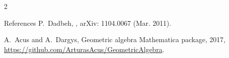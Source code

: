 \documentclass[a4paper,10pt,lithuanian]{article}
\begin{document}
\begin{multicols*}{2}
\begin{thebibliography}{References}
P.~{Dadbeh},
,
\newblock arXiv: 1104.0067  (Mar. 2011).

A.~Acus and A.~Dargys,
\newblock Geometric algebra Mathematica package, 2017,
 \url{https://github.com/ArturasAcus/GeometricAlgebra}.

\end{thebibliography}



\end{multicols*}
\end{document}
